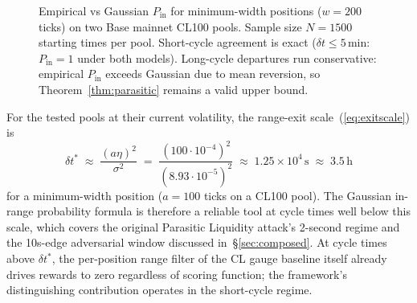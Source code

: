 \documentclass[11pt,a4paper]{article}
\theoremstyle{cgdefinition}
\theoremstyle{cgplain}
\theoremstyle{cgremark}
\begin{document}
\begin{figure}[H]
\centering
{}
\caption{Empirical vs Gaussian $P_{\text{in}}$ for minimum-width positions ($w = 200$ ticks) on two Base mainnet CL100 pools. Sample size $N=1500$ starting times per pool. Short-cycle agreement is exact ($\delta t \leq 5$\,min: $P_{\text{in}} = 1$ under both models). Long-cycle departures run conservative: empirical $P_{\text{in}}$ exceeds Gaussian due to mean reversion, so Theorem~\ref{thm:parasitic} remains a valid upper bound.}
\label{fig:pinvalidation}
\end{figure}

For the tested pools at their current volatility, the range-exit scale~(\ref{eq:exitscale}) is
\[
\delta t^* \;\approx\; \frac{(a\eta)^2}{\sigma^2} \;=\; \frac{(100 \cdot 10^{-4})^2}{(8.93 \cdot 10^{-5})^2} \;\approx\; 1.25 \times 10^4\,\text{s} \;\approx\; 3.5\,\text{h}
\]
for a minimum-width position ($a = 100$ ticks on a CL100 pool). The Gaussian in-range probability formula is therefore a reliable tool at cycle times well below this scale, which covers the original Parasitic Liquidity attack's 2-second regime and the 10s-edge adversarial window discussed in~\S\ref{sec:composed}. At cycle times above $\delta t^*$, the per-position range filter of the CL gauge baseline itself already drives rewards to zero regardless of scoring function; the framework's distinguishing contribution operates in the short-cycle regime.
\end{document}
